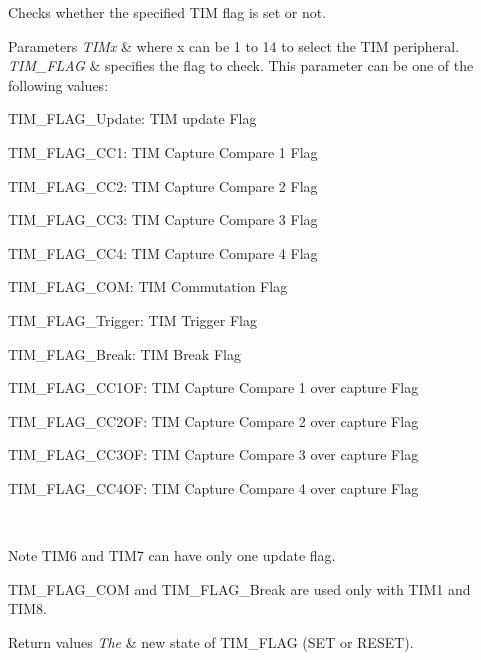Checks whether the specified T\+IM flag is set or not. 


\begin{DoxyParams}{Parameters}
{\em T\+I\+Mx} & where x can be 1 to 14 to select the T\+IM peripheral. \\
\hline
{\em T\+I\+M\+\_\+\+F\+L\+AG} & specifies the flag to check. This parameter can be one of the following values\+: \begin{DoxyItemize}
\item T\+I\+M\+\_\+\+F\+L\+A\+G\+\_\+\+Update\+: T\+IM update Flag \item T\+I\+M\+\_\+\+F\+L\+A\+G\+\_\+\+C\+C1\+: T\+IM Capture Compare 1 Flag \item T\+I\+M\+\_\+\+F\+L\+A\+G\+\_\+\+C\+C2\+: T\+IM Capture Compare 2 Flag \item T\+I\+M\+\_\+\+F\+L\+A\+G\+\_\+\+C\+C3\+: T\+IM Capture Compare 3 Flag \item T\+I\+M\+\_\+\+F\+L\+A\+G\+\_\+\+C\+C4\+: T\+IM Capture Compare 4 Flag \item T\+I\+M\+\_\+\+F\+L\+A\+G\+\_\+\+C\+OM\+: T\+IM Commutation Flag \item T\+I\+M\+\_\+\+F\+L\+A\+G\+\_\+\+Trigger\+: T\+IM Trigger Flag \item T\+I\+M\+\_\+\+F\+L\+A\+G\+\_\+\+Break\+: T\+IM Break Flag \item T\+I\+M\+\_\+\+F\+L\+A\+G\+\_\+\+C\+C1\+OF\+: T\+IM Capture Compare 1 over capture Flag \item T\+I\+M\+\_\+\+F\+L\+A\+G\+\_\+\+C\+C2\+OF\+: T\+IM Capture Compare 2 over capture Flag \item T\+I\+M\+\_\+\+F\+L\+A\+G\+\_\+\+C\+C3\+OF\+: T\+IM Capture Compare 3 over capture Flag \item T\+I\+M\+\_\+\+F\+L\+A\+G\+\_\+\+C\+C4\+OF\+: T\+IM Capture Compare 4 over capture Flag\end{DoxyItemize}
\\
\hline
\end{DoxyParams}
\begin{DoxyNote}{Note}
T\+I\+M6 and T\+I\+M7 can have only one update flag. 

T\+I\+M\+\_\+\+F\+L\+A\+G\+\_\+\+C\+OM and T\+I\+M\+\_\+\+F\+L\+A\+G\+\_\+\+Break are used only with T\+I\+M1 and T\+I\+M8.
\end{DoxyNote}

\begin{DoxyRetVals}{Return values}
{\em The} & new state of T\+I\+M\+\_\+\+F\+L\+AG (S\+ET or R\+E\+S\+ET). \\
\hline
\end{DoxyRetVals}
